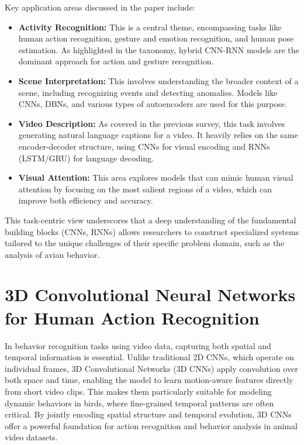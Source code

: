Key application areas discussed in the paper include:
\begin{itemize}
    \item \textbf{Activity Recognition:} This is a central theme, encompassing tasks like human action recognition, gesture and emotion recognition, and human pose estimation. As highlighted in the taxonomy, hybrid CNN-RNN models are the dominant approach for action and gesture recognition.
    \item \textbf{Scene Interpretation:} This involves understanding the broader context of a scene, including recognizing events and detecting anomalies. Models like CNNs, DBNs, and various types of autoencoders are used for this purpose.
    \item \textbf{Video Description:} As covered in the previous survey, this task involves generating natural language captions for a video. It heavily relies on the same encoder-decoder structure, using CNNs for visual encoding and RNNs (LSTM/GRU) for language decoding.
    \item \textbf{Visual Attention:} This area explores models that can mimic human visual attention by focusing on the most salient regions of a video, which can improve both efficiency and accuracy.
\end{itemize}

This task-centric view underscores that a deep understanding of the fundamental building blocks (CNNs, RNNs) allows researchers to construct specialized systems tailored to the unique challenges of their specific problem domain, such as the analysis of avian behavior.


\section{3D Convolutional Neural Networks for Human Action Recognition}

In behavior recognition tasks using video data, capturing both spatial and temporal information is essential. Unlike traditional 2D CNNs, which operate on individual frames, 3D Convolutional Networks (3D CNNs) apply convolution over both space and time, enabling the model to learn motion-aware features directly from short video clips. This makes them particularly suitable for modeling dynamic behaviors in birds, where fine-grained temporal patterns are often critical. By jointly encoding spatial structure and temporal evolution, 3D CNNs offer a powerful foundation for action recognition and behavior analysis in animal video datasets.

